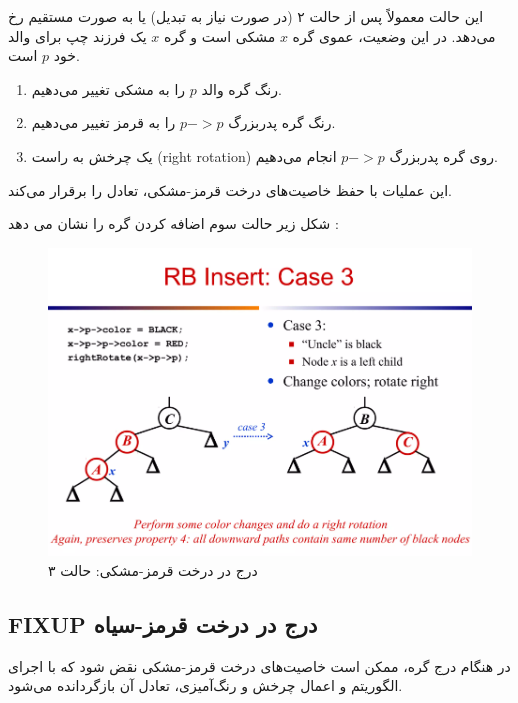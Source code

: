\documentclass[a4paper,12pt]{article}
\begin{document}
							این حالت معمولاً پس از حالت ۲ (در صورت نیاز به تبدیل) یا به صورت مستقیم رخ می‌دهد. در این وضعیت، عموی گره $x$ مشکی است و گره $x$ یک فرزند چپ برای والد خود $p$ است.
							
							\begin{enumerate}
								\item رنگ گره والد $p$ را به مشکی تغییر می‌دهیم.
								\item رنگ گره پدربزرگ $p->p$ را به قرمز تغییر می‌دهیم.
								\item یک چرخش به راست (right rotation) روی گره پدربزرگ $p->p$ انجام می‌دهیم.
							\end{enumerate}
							
							این عملیات با حفظ خاصیت‌های درخت قرمز-مشکی، تعادل را برقرار می‌کند.
							
							
							
							شکل زیر حالت سوم اضافه کردن گره را نشان می دهد :
							
							
							\begin{figure}[H]
								\centering
								\includegraphics[width=1.1\textwidth]{img/insert-case3.png} %
								\caption{درج در درخت قرمز-مشکی: حالت ۳}
							\end{figure}
								

	
	
	
	\subsection{FIXUP درج در درخت قرمز-سیاه}
	
	
	در هنگام درج گره، ممکن است خاصیت‌های درخت قرمز-مشکی نقض شود که با اجرای الگوریتم    و اعمال چرخش و رنگ‌آمیزی، تعادل آن بازگردانده می‌شود.
\end{document}
